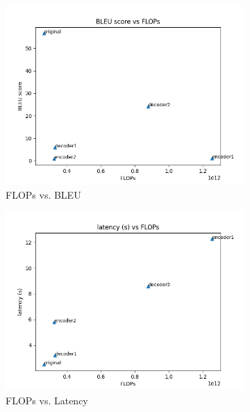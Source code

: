\documentclass[11pt]{article}
\begin{document}
\begin{figure}[!h]

    \centering
    \begin{subfigure}{0.322\textwidth}
        \includegraphics[width=\textwidth]{images/model/BLEU_vs_FLOP.png}
        \caption{FLOPs vs. BLEU}
    \end{subfigure}
    \begin{subfigure}{0.32\textwidth}
        \includegraphics[width=\textwidth]{images/model/latency_vs_FLOP.png}
        \caption{FLOPs vs. Latency}
    \end{subfigure}
    \begin{subfigure}{0.32\textwidth}

\end{subfigure}
\end{figure}
\end{document}
